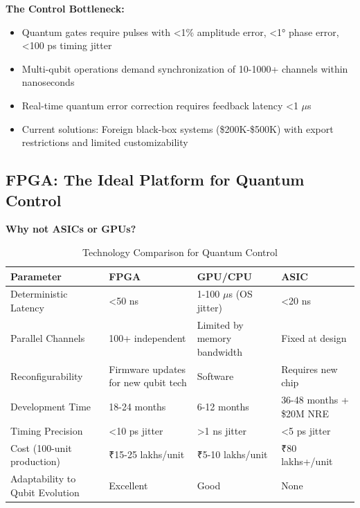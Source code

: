 \documentclass[12pt,a4paper]{article}
\begin{document}
\textbf{The Control Bottleneck:}
\begin{itemize}[leftmargin=*]
    \item Quantum gates require pulses with <1\% amplitude error, <1° phase error, <100 ps timing jitter
    \item Multi-qubit operations demand synchronization of 10-1000+ channels within nanoseconds
    \item Real-time quantum error correction requires feedback latency <1 $\mu$s
    \item Current solutions: Foreign black-box systems (\$200K-\$500K) with export restrictions and limited customizability
\end{itemize}

\subsection{FPGA: The Ideal Platform for Quantum Control}

\textbf{Why not ASICs or GPUs?}
\begin{table}[H]
\centering
\caption{Technology Comparison for Quantum Control}
\begin{tabular}{@{}lp{3.5cm}p{3.5cm}p{3.5cm}@{}}
\toprule
\textbf{Parameter} & \textbf{FPGA} & \textbf{GPU/CPU} & \textbf{ASIC} \\
\midrule
Deterministic Latency & <50 ns & 1-100 $\mu$s (OS jitter) & <20 ns \\
Parallel Channels & 100+ independent & Limited by memory bandwidth & Fixed at design \\
Reconfigurability & Firmware updates for new qubit tech & Software & Requires new chip \\
Development Time & 18-24 months & 6-12 months & 36-48 months + \$20M NRE \\
Timing Precision & <10 ps jitter & >1 ns jitter & <5 ps jitter \\
Cost (100-unit production) & ₹15-25 lakhs/unit & ₹5-10 lakhs/unit & ₹80 lakhs+/unit \\
Adaptability to Qubit Evolution & Excellent & Good & None \\
\bottomrule
\end{tabular}
\end{table}
\end{document}
